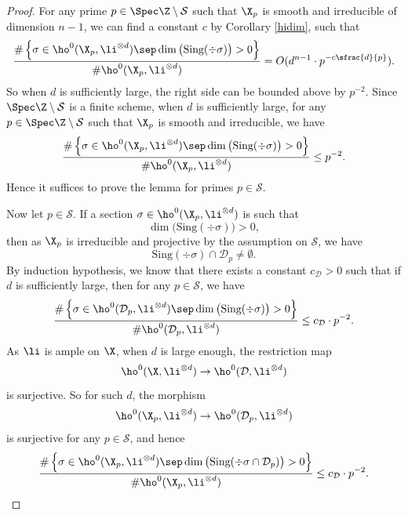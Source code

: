 \begin{proof}
For any prime $p\in \Spec \Z\setminus\mathcal{S}$ such that $\X_p$ is smooth and irreducible of dimension $n-1$, we can find a constant $c$ by Corollary \ref{hidim}, such that
\[
\frac{\#\left\{ \sigma\in \ho^0(\X_p, \li^{\otimes d})\sep \dim\big(\mathrm{Sing(\div \sigma})\big)>0 \right\}}{\#\ho^0(\X_p, \li^{\otimes d})}=O(d^{n-1}\cdot p^{-c\sfrac{d}{p}}).
\]
So when $d$ is sufficiently large, the right side can be bounded above by $p^{-2}$. Since $\Spec \Z\setminus\mathcal{S}$ is a finite scheme, when $d$ is sufficiently large, for any $p\in \Spec \Z\setminus\mathcal{S}$ such that $\X_p$ is smooth and irreducible, we have
\[
\frac{\#\left\{ \sigma\in \ho^0(\X_p, \li^{\otimes d})\sep \dim\big(\mathrm{Sing(\div \sigma})\big)>0 \right\}}{\#\ho^0(\X_p, \li^{\otimes d})}\leq p^{-2}.
\]
Hence it suffices to prove the lemma for primes $p\in \mathcal{S}$.


Now let $p\in \mathcal{S}$. If a section $\sigma\in \ho^0(\X_p, \li^{\otimes d})$ is such that
\[
\dim\big(\mathrm{Sing}(\div \sigma) \big)>0,
\]
then as $\X_p$ is irreducible and projective by the assumption on $\mathcal{S}$, we have
\[
\mathrm{Sing}(\div \sigma)\cap \mathcal{D}_p\not=\emptyset.
\]
By induction hypothesis, we know that there exists a constant $c_\mathcal{D}>0$ such that if $d$ is sufficiently large, then for any $p\in \mathcal{S}$, we have
\[
\frac{\#\left\{ \sigma\in \ho^0(\mathcal{D}_p, \li^{\otimes d})\sep \dim\big(\mathrm{Sing(\div \sigma})\big)>0 \right\}}{\#\ho^0(\mathcal{D}_p, \li^{\otimes d})}\leq c_\mathcal{D}\cdot p^{-2}.
\]
As $\li$ is ample on $\X$, when $d$ is large enough, the restriction map
\[
\ho^0(\X, \li^{\otimes d}) \to \ho^0(\mathcal{D}, \li^{\otimes d})
\]
is surjective. So for such $d$, the morphism
\[
\ho^0(\X_p, \li^{\otimes d}) \to \ho^0(\mathcal{D}_p, \li^{\otimes d})
\]
is surjective for any $p\in \mathcal{S}$, and hence
\[
\frac{\#\left\{ \sigma\in \ho^0(\X_p, \li^{\otimes d})\sep \dim\big(\mathrm{Sing(\div }\sigma\cap \mathcal{D}_p)\big)>0 \right\}}{\#\ho^0(\X_p, \li^{\otimes d})}\leq c_\mathcal{D}\cdot p^{-2}.
\]


\end{proof}
